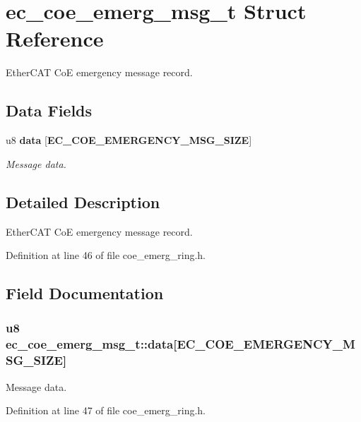 \section{ec\-\_\-coe\-\_\-emerg\-\_\-msg\-\_\-t \-Struct \-Reference}
\label{structec__coe__emerg__msg__t}


\-Ether\-C\-A\-T \-Co\-E emergency message record.  


\subsection*{\-Data \-Fields}
\begin{DoxyCompactItemize}
\item 
u8 {\bf data} [{\bf \-E\-C\-\_\-\-C\-O\-E\-\_\-\-E\-M\-E\-R\-G\-E\-N\-C\-Y\-\_\-\-M\-S\-G\-\_\-\-S\-I\-Z\-E}]
\begin{DoxyCompactList}\small\item\em \-Message data. \end{DoxyCompactList}\end{DoxyCompactItemize}


\subsection{\-Detailed \-Description}
\-Ether\-C\-A\-T \-Co\-E emergency message record. 

\-Definition at line 46 of file coe\-\_\-emerg\-\_\-ring.\-h.



\subsection{\-Field \-Documentation}
\subsubsection[{data}]{\setlength{\rightskip}{0pt plus 5cm}u8 {\bf ec\-\_\-coe\-\_\-emerg\-\_\-msg\-\_\-t\-::data}[{\bf \-E\-C\-\_\-\-C\-O\-E\-\_\-\-E\-M\-E\-R\-G\-E\-N\-C\-Y\-\_\-\-M\-S\-G\-\_\-\-S\-I\-Z\-E}]}\label{structec__coe__emerg__msg__t_a34851e07295140751d9d7edf7dea2561}


\-Message data. 



\-Definition at line 47 of file coe\-\_\-emerg\-\_\-ring.\-h.

